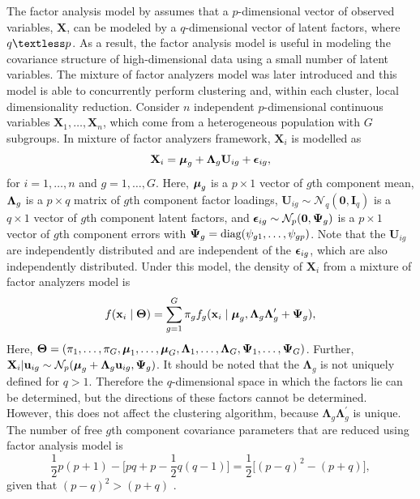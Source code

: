 \documentclass[12pt]{article}
\newcommand{\vecX}{\mathbf{X}}
\newcommand{\vecU}{\mathbf{U}}
\newcommand{\vecI}{\mathbf{I}}
\newcommand{\veczero}{\mathbf{0}}
\newcommand{\vecmu}{\mbox{\boldmath$\mu$}}
\newcommand{\vecLambda}{\mbox{\boldmath$\Lambda$}}
\newcommand{\matepsilon}{\mbox{\boldmath$\epsilon$}}
\newcommand{\matPsi}{\mbox{\boldmath$\Psi$}}
\begin{document}
The factor analysis model by \citet{spearman1904} assumes that a $p$-dimensional vector of observed variables, $\mathbf{\vecX}$, can be modeled by a $q$-dimensional vector of latent factors, where $q \textless p$. As a result, the factor analysis model is useful in modeling the covariance structure of high-dimensional data using a small number of latent variables. The mixture of factor analyzers model was later introduced \citep{ghahramani1997} and this model is able to concurrently perform clustering and, within each cluster, local dimensionality reduction. Consider $n$ independent $p$-dimensional continuous variables $\vecX_1, \ldots, \vecX_n$, which come from a heterogeneous population with $G$ subgroups. In mixture of factor analyzers framework, $\vecX_i$ is modelled as
\begin{equation*}
\vecX_i = \vecmu_g + \vecLambda_g\vecU_{ig}+ \matepsilon_{ig},
\end{equation*} 
for $i=1,\ldots,n$ and $g=1,\ldots,G$. Here, $\vecmu_g$ is a $p \times 1$ vector of $g$th component mean, $\vecLambda_g$ is a $p \times q$ matrix of $g$th component factor loadings, $\vecU_{ig} \sim \mathcal{N}_q(\veczero,\vecI_q)$ is a $q \times 1$ vector of $g$th component latent factors, and $\matepsilon_{ig}\sim\mathcal{N}_p(\veczero,\matPsi_g)$ is a $p \times 1$ vector of $g$th component errors with $\matPsi_g = \text{diag}(\psi_{g1},\ldots,\psi_{gp})$. Note that the $\vecU_{ig}$ are independently distributed and are independent of the $\matepsilon_{ig}$, which are also independently distributed. Under this  model, the density of $\vecX_i$ from a mixture of factor analyzers model is 
\begin{equation*}
f(\mathbf{x}_i \mid \boldsymbol{\Theta}) = \sum_{g=1}^G \pi_g f_g(\mathbf{x}_i \mid \vecmu_g, \vecLambda_g \vecLambda_g^{\prime} + \matPsi_g),
\end{equation*} 
Here, $\boldsymbol{\Theta} = (\pi_1, \ldots, \pi_G, \vecmu_1, \ldots, \vecmu_G, \mathbf{\Lambda}_1, \ldots, \mathbf{\Lambda}_G, \mathbf{\Psi}_1, \ldots, \mathbf{\Psi}_G)$. Further, $\vecX_i| \mathbf{u}_{ig} \sim \mathcal{N}_p(\vecmu_g + \vecLambda_g \mathbf{u}_{ig}, \matPsi_g)$. It should be noted that the $\mathbf{\Lambda}_g$ is not uniquely defined for $q > 1$. Therefore the $q$-dimensional space in which the factors lie can be determined, but the directions of these factors cannot be determined.  However, this does not affect the clustering algorithm, because $\mathbf{\Lambda}_g \mathbf{\Lambda}_g^{\prime}$ is unique. The number of free $g$th component covariance parameters that are reduced using factor analysis model is
\begin{equation*}
\frac{1}{2} p(p+1) - \Big[ pq +p - \frac{1}{2}q(q-1) \Big] = \frac{1}{2} \Big[ (p-q)^2 - (p+q) \Big],
\end{equation*} 
given that $(p-q)^2 > (p+q)$ \citep{lawley1962, mcnicholas2016}.
\end{document}
